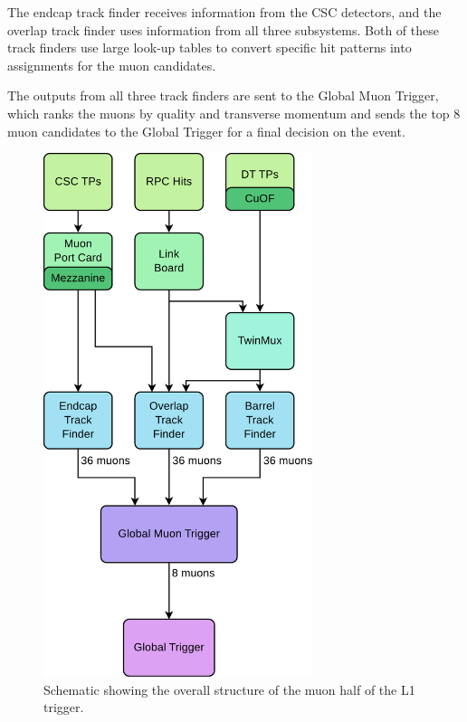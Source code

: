 The endcap track finder receives information from the CSC detectors, and the overlap track finder uses information from all three subsystems. Both of these track finders use large look-up tables to convert specific hit patterns into \pT assignments for the muon candidates.

The outputs from all three track finders are sent to the Global Muon Trigger, which ranks the muons by quality and transverse momentum and sends the top 8 muon candidates to the Global Trigger for a final decision on the event.

\begin{figure}[h]
\begin{center}
\includegraphics[width=0.7\textwidth]{Figures/Trigger/muonL1T.pdf}
\end{center}
\caption{Schematic showing the overall structure of the muon half of the L1 trigger.}
\label{fig:muonL1T}
\end{figure}

